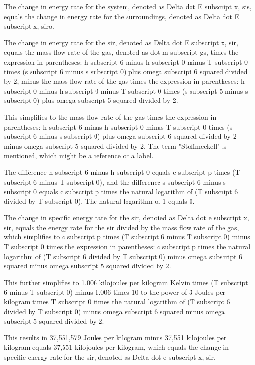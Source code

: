 The change in energy rate for the system, denoted as Delta dot E subscript x, sis, equals the change in energy rate for the surroundings, denoted as Delta dot E subscript x, siro.

The change in energy rate for the sir, denoted as Delta dot E subscript x, sir, equals the mass flow rate of the gas, denoted as dot m subscript gs, times the expression in parentheses: h subscript 6 minus h subscript 0 minus T subscript 0 times (s subscript 6 minus s subscript 0) plus omega subscript 6 squared divided by 2, minus the mass flow rate of the gas times the expression in parentheses: h subscript 0 minus h subscript 0 minus T subscript 0 times (s subscript 5 minus s subscript 0) plus omega subscript 5 squared divided by 2.

This simplifies to the mass flow rate of the gas times the expression in parentheses: h subscript 6 minus h subscript 0 minus T subscript 0 times (s subscript 6 minus s subscript 0) plus omega subscript 6 squared divided by 2 minus omega subscript 5 squared divided by 2. The term "Stoffmeckell" is mentioned, which might be a reference or a label.

The difference h subscript 6 minus h subscript 0 equals c subscript p times (T subscript 6 minus T subscript 0), and the difference s subscript 6 minus s subscript 0 equals c subscript p times the natural logarithm of (T subscript 6 divided by T subscript 0). The natural logarithm of 1 equals 0.

The change in specific energy rate for the sir, denoted as Delta dot e subscript x, sir, equals the energy rate for the sir divided by the mass flow rate of the gas, which simplifies to c subscript p times (T subscript 6 minus T subscript 0) minus T subscript 0 times the expression in parentheses: c subscript p times the natural logarithm of (T subscript 6 divided by T subscript 0) minus omega subscript 6 squared minus omega subscript 5 squared divided by 2.

This further simplifies to 1.006 kilojoules per kilogram Kelvin times (T subscript 6 minus T subscript 0) minus 1.006 times 10 to the power of 3 Joules per kilogram times T subscript 0 times the natural logarithm of (T subscript 6 divided by T subscript 0) minus omega subscript 6 squared minus omega subscript 5 squared divided by 2.

This results in 37,551,579 Joules per kilogram minus 37,551 kilojoules per kilogram equals 37,551 kilojoules per kilogram, which equals the change in specific energy rate for the sir, denoted as Delta dot e subscript x, sir.
